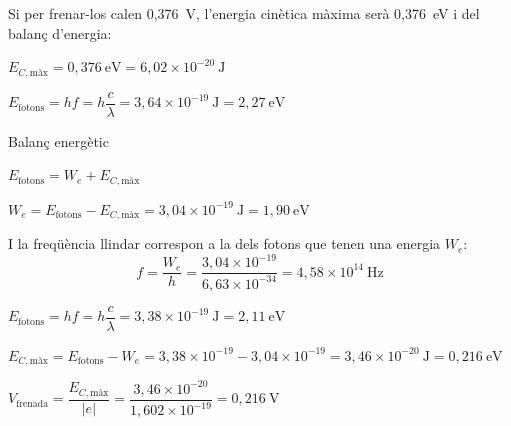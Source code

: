 \begin{solapartat}
Si per frenar-los calen 0,376~V, l'energia cinètica màxima serà 0,376~eV i del balanç d'energia:

 $E_{C,\text{màx}} = 0,376\ \mathrm{eV} = 6,02\times 10^{-20}\ \mathrm{J}$

 $E_\text{fotons} = hf = h\dfrac{c}{\lambda} = 3,64\times 10^{-19}\ \mathrm{J} = 2,27\ \mathrm{eV}$

Balanç energètic

 $E_\text{fotons} = W_e + E_{C,\text{màx}}$

 $W_e = E_\text{fotons} - E_{C,\text{màx}} = 3,04\times 10^{-19}\ \mathrm{J} = 1,90\ \mathrm{eV}$

 I la freqüència llindar correspon a la dels fotons que tenen una energia $W_e$:
\[ f = \frac{W_e}{h} = \frac{3,04\times 10^{-19}}{6,63\times 10^{-34}} = 4,58\times 10^{14}\ \mathrm{Hz} \]
\end{solapartat}

\begin{solapartat}
 $E_\text{fotons} = hf = h\dfrac{c}{\lambda} = 3,38\times 10^{-19}\ \mathrm{J} = 2,11\ \mathrm{eV}$

 $E_{C,\text{màx}} = E_\text{fotons} - W_e = 3,38\times 10^{-19} - 3,04\times 10^{-19} = 3,46\times 10^{-20}\ \mathrm{J} = 0,216\ \mathrm{eV}$

 $V_\text{frenada} = \dfrac{E_{C,\text{màx}}}{|e|} = \dfrac{3,46\times 10^{-20}}{1,602\times 10^{-19}} = 0,216\ \mathrm{V}$
\end{solapartat}
